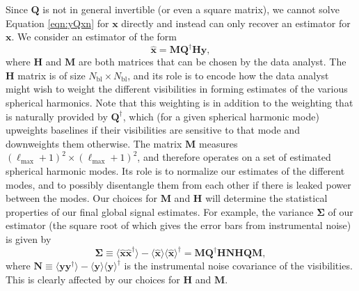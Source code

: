 \documentclass[twocolumn,apj,numberedappendix]{emulateapj}
\newcommand{\xhat}{\hat{\mathbf{x}}}
\newcommand{\y}{\mathbf{y}}
\newcommand{\N}{\mathbf{N}}
\newcommand{\Hmat}{\mathbf{H}}
\newcommand{\Q}{\mathbf{Q}}
\newcommand{\M}{\mathbf{M}}
\begin{document}
%

Since $\Q$ is not in general invertible (or even a square matrix), we cannot solve Equation \eqref{eqn:yQxn} for $\mathbf{x}$ directly and instead can only recover an estimator for $\mathbf{x}$. We consider an estimator of the form 
\begin{equation}
\mathbf{\hat x} = \M \Q^\dagger \Hmat \y,
\label{eqn:xhat}
\end{equation}
where $\Hmat$ and $\M$ are both matrices that can be chosen by the data analyst. The $\Hmat$ matrix is of size $N_\textrm{bl} \times N_\textrm{bl}$, and its role is to encode how the data analyst might wish to weight the different visibilities in forming estimates of the various spherical harmonics. Note that this weighting is in addition to the weighting that is naturally provided by $\Q^\dagger$, which (for a given spherical harmonic mode) upweights baselines if their visibilities are sensitive to that mode and downweights them otherwise. The matrix $\M$ measures $(\ell_\textrm{max} +1)^2 \times (\ell_\textrm{max} +1)^2$, and therefore operates on a set of estimated spherical harmonic modes. Its role is to normalize our estimates of the different modes, and to possibly disentangle them from each other if there is leaked power between the modes. Our choices for $\M$ and $\Hmat$ will determine the statistical properties of our final global signal estimates. For example, the variance $\boldsymbol \Sigma$ of our estimator (the square root of which gives the error bars from instrumental noise) is given by
\begin{equation}
\label{eq:NoiseMatrixSigma}
\boldsymbol \Sigma \equiv \langle \xhat \xhat^\dagger \rangle - \langle \xhat \rangle \langle \xhat \rangle^\dagger = \M \Q^\dagger \mathbf{H} \N \mathbf{H} \Q \M,
\end{equation}
where $\mathbf{N} \equiv \langle \y \y^\dagger \rangle - \langle \y \rangle \langle \y \rangle^\dagger$ is the instrumental noise covariance of the visibilities. This is clearly affected by our choices for $\mathbf{H}$ and $\M$.
\end{document}
